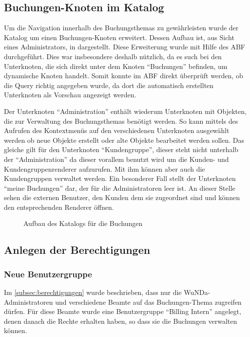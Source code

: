 \subsection{Buchungen-Knoten im Katalog}
Um die Navigation innerhalb des Buchungsthemas zu gewährleisten wurde der Katalog um einen Buchungen-Knoten erweitert.
Dessen Aufbau ist, aus Sicht eines Administrators, in  dargestellt.
Diese Erweiterung wurde mit Hilfe des \ac{ABF} durchgeführt.
Dies war insbesondere deshalb nützlich, da es such bei den Unterknoten, die sich direkt unter dem Knoten "`Buchungen"' befinden, um dynamische Knoten handelt.
Somit konnte im \ac{ABF} direkt überprüft werden, ob die Query richtig angegeben wurde, da dort die automatisch erstellten Unterknoten als Vorschau angezeigt werden.

Der Unterknoten "`Administration"' enthält wiederum Unterknoten mit Objekten, die zur Verwaltung des Buchungsthemas benötigt werden.
So kann mittels des Aufrufen des Kontextmenüs auf den verschiedenen Unterknoten ausgewählt werden ob neue Objekte erstellt oder alte Objekte bearbeitet werden sollen.
Das gleiche gilt für den Unterknoten "`Kundengruppe"', dieser steht nicht unterhalb der "`Administration"' da dieser vorallem benutzt wird um die Kunden- und Kundengruppenrenderer aufzurufen. Mit ihm können aber auch die Kundengruppen verwaltet werden.
Ein besonderer Fall stellt der Unterknoten "`meine Buchungen"' dar, der für die Administratoren leer ist.
An dieser Stelle sehen die externen Benutzer, den Kunden dem sie zugeordnet sind und können den entsprechenden Renderer öffnen. 

\begin{figure}[htb]
	\centering
	\caption{Aufbau des Katalogs für die Buchungen}
	\label{fig:katalog}
\end{figure}


\subsection{Anlegen der Berechtigungen}
\subsubsection{Neue Benutzergruppe}
Im \autoref{subsec:berechtigungen} wurde beschrieben, dass nur die \ac{WuNDa}-Administratoren und verschiedene Beamte auf das Buchungen-Thema zugreifen dürfen.
Für diese Beamte wurde eine Benutzergruppe "`Billing Intern"' angelegt, denen danach die Rechte erhalten haben, so dass sie die Buchungen verwalten können.

